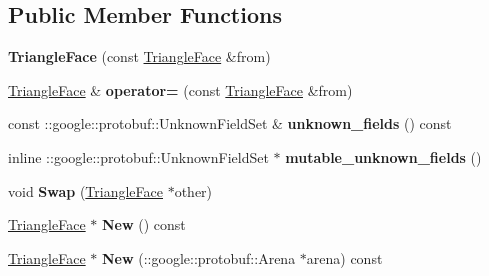 \subsection*{Public Member Functions}
\begin{DoxyCompactItemize}
\item 
\hypertarget{classstruct_definitions_1_1_triangle_face_a4dca60d70835a67fa8782cc1b4bd9d2b}{}\label{classstruct_definitions_1_1_triangle_face_a4dca60d70835a67fa8782cc1b4bd9d2b} 
{\bfseries Triangle\+Face} (const \hyperlink{classstruct_definitions_1_1_triangle_face}{Triangle\+Face} \&from)
\item 
\hypertarget{classstruct_definitions_1_1_triangle_face_a1431a848f7150ece2ccbaafde50575ae}{}\label{classstruct_definitions_1_1_triangle_face_a1431a848f7150ece2ccbaafde50575ae} 
\hyperlink{classstruct_definitions_1_1_triangle_face}{Triangle\+Face} \& {\bfseries operator=} (const \hyperlink{classstruct_definitions_1_1_triangle_face}{Triangle\+Face} \&from)
\item 
\hypertarget{classstruct_definitions_1_1_triangle_face_a28287de88e412828c7e89127ad10d64f}{}\label{classstruct_definitions_1_1_triangle_face_a28287de88e412828c7e89127ad10d64f} 
const \+::google\+::protobuf\+::\+Unknown\+Field\+Set \& {\bfseries unknown\+\_\+fields} () const
\item 
\hypertarget{classstruct_definitions_1_1_triangle_face_a28e8c7e82b604be4d16ddee3d38b2aa5}{}\label{classstruct_definitions_1_1_triangle_face_a28e8c7e82b604be4d16ddee3d38b2aa5} 
inline \+::google\+::protobuf\+::\+Unknown\+Field\+Set $\ast$ {\bfseries mutable\+\_\+unknown\+\_\+fields} ()
\item 
\hypertarget{classstruct_definitions_1_1_triangle_face_a72d081091dc25cf6eab5d96c5003f718}{}\label{classstruct_definitions_1_1_triangle_face_a72d081091dc25cf6eab5d96c5003f718} 
void {\bfseries Swap} (\hyperlink{classstruct_definitions_1_1_triangle_face}{Triangle\+Face} $\ast$other)
\item 
\hypertarget{classstruct_definitions_1_1_triangle_face_a16e88b1568b7b6a837dd5c2e6ef5ca6e}{}\label{classstruct_definitions_1_1_triangle_face_a16e88b1568b7b6a837dd5c2e6ef5ca6e} 
\hyperlink{classstruct_definitions_1_1_triangle_face}{Triangle\+Face} $\ast$ {\bfseries New} () const
\item 
\hypertarget{classstruct_definitions_1_1_triangle_face_a8f67d35362912dea8e9c7dbff2b07d7f}{}\label{classstruct_definitions_1_1_triangle_face_a8f67d35362912dea8e9c7dbff2b07d7f} 
\hyperlink{classstruct_definitions_1_1_triangle_face}{Triangle\+Face} $\ast$ {\bfseries New} (\+::google\+::protobuf\+::\+Arena $\ast$arena) const

\end{DoxyCompactItemize}
